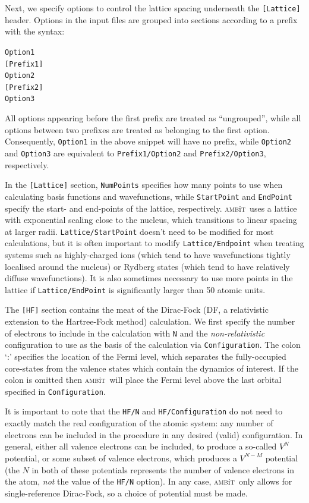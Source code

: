 \documentclass{report}
\newcommand{\ambit}{\textsc{amb}{\footnotesize i}\textsc{t}}
\begin{document}
Next, we specify options to control the lattice spacing underneath the \texttt{[Lattice]} header. 
Options in the input files are grouped into sections according to a prefix with the
syntax:

\texttt{Option1}
\smallskip\\
\texttt{[Prefix1]}\\
\texttt{Option2}
\smallskip\\
\texttt{[Prefix2]}\\
\texttt{Option3}

All options appearing before the first prefix are treated as ``ungrouped'', while all options between
two prefixes are treated as belonging to the first option. Consequently, \texttt{Option1} in the above
snippet will have no prefix, while \texttt{Option2} and \texttt{Option3} are equivalent to
\texttt{Prefix1/Option2} and \texttt{Prefix2/Option3}, respectively.

In the \texttt{[Lattice]} section, \texttt{NumPoints} specifies how many points to use when calculating
basis functions and wavefunctions, while \texttt{StartPoint} and \texttt{EndPoint} specify the start-
and end-points of the lattice, respectively. \ambit\  uses a lattice with exponential scaling close to
the nucleus, which transitions to linear spacing at larger radii. \texttt{Lattice/StartPoint} doesn't
need to be modified for most calculations, but it is often important to modify \texttt{Lattice/Endpoint}
when treating systems such as highly-charged ions (which tend to have wavefunctions tightly localised
around the nucleus) or Rydberg states (which tend to have relatively diffuse wavefunctions). It is also
sometimes necessary to use more points in the lattice if \texttt{Lattice/EndPoint} is significantly
larger than 50 atomic units.

The \texttt{[HF]} section contains the meat of the Dirac-Fock (DF, a relativistic extension to the
Hartree-Fock method) calculation. We first specify the number of electrons to include in the calculation
with \texttt{N} and the \emph{non-relativistic} configuration to use as the basis of the calculation via
\texttt{Configuration}. The colon `:' specifies the location of the Fermi level, which separates the
fully-occupied core-states from the valence states which contain the dynamics of interest. If the colon
is omitted then \ambit\  will place the Fermi level above the last orbital specified in
\texttt{Configuration}.

It is important to note that the \texttt{HF/N} and \texttt{HF/Configuration} do not need to exactly
match the real configuration of the atomic system: any number of electrons can be included in the 
procedure in any desired (valid) configuration. In general, either all valence electrons can be
included, to produce a so-called $V^N$ potential, or some subset of valence electrons, which produces a
$V^{N-M}$ potential (the $N$ in both of these potentials represents the number of valence electrons in 
the atom, \emph{not} the value of the \texttt{HF/N} option). In any case, \ambit\ only allows for single-reference Dirac-Fock, so a choice of potential must be made.
\end{document}
